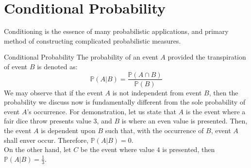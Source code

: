 \section{Conditional Probability}
Conditioning is the essence of many probabilistic applications, and primary method of constructing complicated probabilistic measures.
\begin{ln-define}{Conditional Probability}{}
    The probability of an event $A$ provided the transpiration of event $B$ is denoted as:
    \[
        \mathbb{P}(A | B) = \frac{\mathbb{P}(A \cap B)}{\mathbb{P}(B)}
    \]
    We may observe that if the event $A$ is not independent from event $B$, then the probability we discuss now is fundamentally different from the sole probability of event $A$'s occurrence.
    \tcblower
    For demonstration, let us state that $A$ is the event where a fair dice throw presents value $3$, and $B$ is where an even value is presented. Then, the event $A$ is dependent upon $B$ such that, with the occurrence of $B$, event $A$ shall enver occur.
    Therefore, $\mathbb{P}(A | B) = 0$. \\
    On the other hand, let $C$ be the event where value $4$ is presented, then $\mathbb{P}(A|B) = \frac{1}{3}$.
\end{ln-define}

